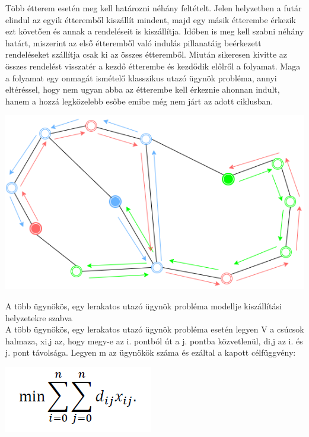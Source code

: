 

Több étterem esetén meg kell határozni néhány feltételt. Jelen helyzetben a futár elindul az egyik étteremből kiszállít mindent, majd egy másik étterembe érkezik ezt követően és annak a rendeléseit is kiszállítja. Időben is meg kell szabni néhány határt, miszerint az első étteremből való indulás pillanatáig beérkezett rendeléseket szállítja csak ki az összes étteremből. Miután sikeresen kivitte az összes rendelést visszatér a kezdő étterembe és kezdődik előlről a folyamat. Maga a folyamat egy onmagát ismételő klasszikus utazó ügynök probléma, annyi eltéréssel, hogy nem ugyan abba az étterembe kell érkeznie ahonnan indult, hanem a hozzá legközelebb esőbe emibe még nem járt az adott ciklusban.

\includegraphics[scale=0.6]{images/Circulartsp.png}


A több ügynökös, egy lerakatos utazó ügynök probléma modellje kiszállítási helyzetekre szabva\\

A több ügynökös, egy lerakatos utazó ügynök probléma esetén legyen V a csúcsok halmaza, xi,j az, hogy megy-e az i. pontból út a j. pontba közvetlenül, di,j az i. és j. pont távolsága. Legyen m az ügynökök száma és ezáltal a kapott célfüggvény:

\includegraphics[scale=0.5]{images/mtsp1.png}

